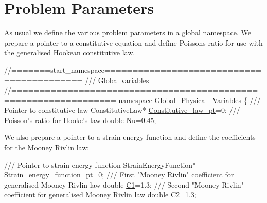  

\hypertarget{index_namespace}{}\section{Problem Parameters}\label{index_namespace}
As usual we define the various problem parameters in a global namespace. We prepare a pointer to a constitutive equation and define Poisson\textquotesingle{}s ratio for use with the generalised Hookean constitutive law.


\begin{DoxyCodeInclude}
\textcolor{comment}{//=======start\_namespace==========================================}
\textcolor{comment}{/// Global variables}
\textcolor{comment}{}\textcolor{comment}{//================================================================}
\textcolor{keyword}{namespace }\hyperlink{namespaceGlobal__Physical__Variables}{Global\_Physical\_Variables}
\{
\textcolor{comment}{}
\textcolor{comment}{ /// Pointer to constitutive law}
\textcolor{comment}{} ConstitutiveLaw* \hyperlink{namespaceGlobal__Physical__Variables_a2a37fb040c832ee7a086bb13bb02a100}{Constitutive\_law\_pt}=0;
\textcolor{comment}{}
\textcolor{comment}{ /// Poisson's ratio for Hooke's law}
\textcolor{comment}{} \textcolor{keywordtype}{double} \hyperlink{namespaceGlobal__Physical__Variables_a3962c36313826b19f216f6bbbdd6a477}{Nu}=0.45;

\end{DoxyCodeInclude}


We also prepare a pointer to a strain energy function and define the coefficients for the Mooney Rivlin law\+:


\begin{DoxyCodeInclude}
\textcolor{comment}{}
\textcolor{comment}{ /// Pointer to strain energy function }
\textcolor{comment}{} StrainEnergyFunction* \hyperlink{namespaceGlobal__Physical__Variables_a73135f793690b4386bf83bbefc7bf310}{Strain\_energy\_function\_pt}=0;
\textcolor{comment}{}
\textcolor{comment}{ /// First "Mooney Rivlin" coefficient for generalised Mooney Rivlin law}
\textcolor{comment}{} \textcolor{keywordtype}{double} \hyperlink{namespaceGlobal__Physical__Variables_a849754fa7155c1a31481674ce4845658}{C1}=1.3;
\textcolor{comment}{}
\textcolor{comment}{ /// Second "Mooney Rivlin" coefficient for generalised Mooney Rivlin law}
\textcolor{comment}{} \textcolor{keywordtype}{double} \hyperlink{namespaceGlobal__Physical__Variables_af9defd1b5745cce50d2c386b3ac0e0ae}{C2}=1.3;

\end{DoxyCodeInclude}


